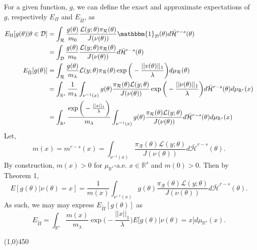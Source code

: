 \documentclass[10pt,fleqn]{article}
\DeclareMathOperator{\1}{\mathbbm{1}}
\begin{document}
{For a given function, $g$, we can define the exact and approximate expectations of $g$, respectively $E_\Pi$ and $E_{\tilde{\Pi}}$, as
\begin{align*}
E_\Pi[g(\theta)|\theta\in\mathcal{D}] &= \int_\mathcal{R} \frac{g(\theta)}{m_0} \frac{\mathcal{L}(y;\theta)\pi_\mathcal{R}(\theta)}{J(\nu(\theta))}\mathbbm{1}_\mathcal{D}(\theta)d\bar{\mathcal{H}}^{r-s}(\theta) \\
&=\int_\mathcal{D} \frac{g(\theta)}{m_0} \frac{\mathcal{L}(y;\theta)\pi_\mathcal{R}(\theta)}{J(\nu(\theta))}d\bar{\mathcal{H}}^{r-s}(\theta)\\
E_{\tilde{\Pi}}[g(\theta)] &= \int_\mathcal{R}  \frac{g(\theta)}{m_\lambda} \mathcal{L}(y;\theta)\pi_\mathcal{R}(\theta)\exp\bigg(-\frac{||v(\theta)||_1}{\lambda}\bigg)d\mu_\mathcal{R}(\theta) \\
&= \int_{\mathbb{R}^s} \frac{1}{m_\lambda} \int_{\nu^{-1}(x)} g(\theta) \frac{\pi_\mathcal{R}(\theta)\mathcal{L}(y;\theta)}{J(\nu(\theta))} \exp\bigg(-\frac{||\nu(\theta)||_1}{\lambda}\bigg) d\bar{\mathcal{H}}^{r-s}(\theta) d\mu_{\mathbb{R}^s}(x) \\
&=\int_{\mathbb{R}^s} \frac{\exp\bigg(-\frac{||x||_1}{\lambda}\bigg) }{m_\lambda} \int_{\nu^{-1}(x)} g(\theta) \frac{\pi_\mathcal{R}(\theta)\mathcal{L}(y;\theta)}{J(\nu(\theta))} d\bar{\mathcal{H}}^{r-s}(\theta) d\mu_{\mathbb{R}^s}(x) 
\end{align*}
Let, $$m(x) = m^{r-s}(x) = \int_{\nu^{-1}(x)}\frac{\pi_\mathcal{R}(\theta)\mathcal{L}(y;\theta)}{J(\nu(\theta))} d\bar{\mathcal{H}}^{r-s}(\theta) .$$
By construction, $m(x) > 0$ for $\mu_{\mathbb{R}^s}$-a.e. $x\in \mathbb{R}^s$ and $m(0)>0$. Then by Theorem 1,
\begin{equation}
E[g(\theta) | \nu(\theta) = x] = \frac{1}{m(x)} \int_{\nu^{-1}(x)} g(\theta)\frac{\pi_\mathcal{R}(\theta)\mathcal{L}(y;\theta)}{J(\nu(\theta))} d\bar{\mathcal{H}}^{r-s}(\theta).
\end{equation}
As such, we may may express $E_{\tilde{\Pi}}[g(\theta)]$ as 
\begin{equation}
E_{\tilde{\Pi}} = \int_{\mathbb{R}^s} \frac{m(x)}{m_\lambda}\exp\bigg(-\frac{||x||_1}{\lambda}\bigg) E\big[g(\theta)|\nu(\theta)=x\big] d\mu_{\mathbb{R}^s}(x).
\end{equation}

\begin{center}\line(1,0){450}\end{center}

}
\end{document}
